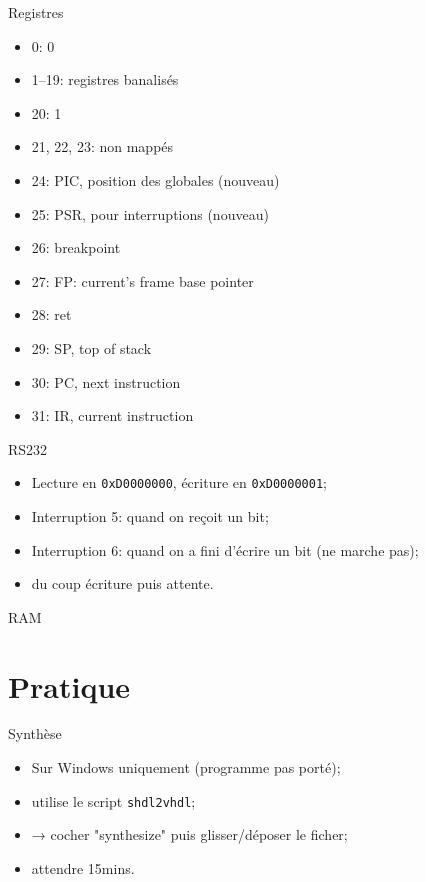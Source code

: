 \documentclass{beamer}
\begin{document}
    \begin{frame}{Registres}
      \begin{itemize}
        \item 0: 0
        \item 1--19: registres banalisés
        \item 20: 1
        \item 21, 22, 23: non mappés
        \item 24: PIC, position des globales (nouveau)
        \item 25: PSR, pour interruptions (nouveau)
        \item 26: breakpoint
        \item 27: FP: current's frame base pointer
        \item 28: ret
        \item 29: SP, top of stack
        \item 30: PC, next instruction
        \item 31: IR, current instruction
      \end{itemize}
    \end{frame}

    \begin{frame}[fragile]{RS232}
      \begin{itemize}
        \item Lecture en \verb+0xD0000000+, écriture en \verb+0xD0000001+;
        \item Interruption 5: quand on reçoit un bit;
        \item Interruption 6: quand on a fini d'écrire un bit (ne marche pas);
          \pause
        \item du coup écriture puis attente.
      \end{itemize}
\end{frame}

    \begin{frame}{RAM}
    \end{frame}

  \section{Pratique}
    \begin{frame}[fragile]{Synthèse}
      \begin{itemize}
        \item Sur Windows uniquement (programme pas porté);
        \item utilise le script \verb+shdl2vhdl+;
        \item → cocher "synthesize" puis glisser/déposer le ficher;
        \item attendre 15mins.
      \end{itemize}
\end{frame}
\end{document}
